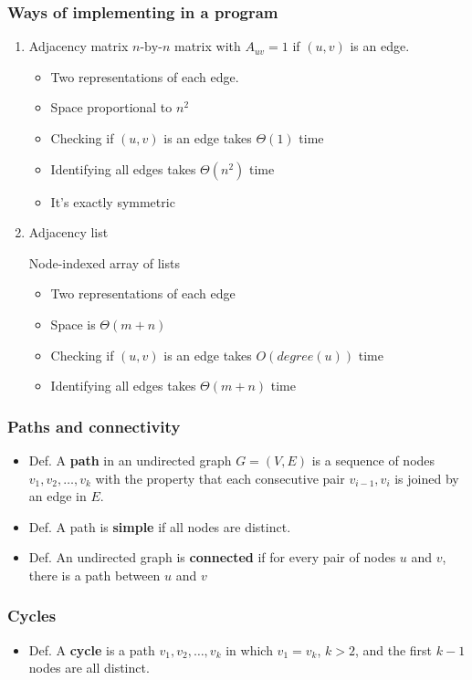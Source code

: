 \documentclass[11pt]{article}
\begin{document}
\subsubsection{Ways of implementing in a program}
\label{sec:orgc5e0200}
\begin{enumerate}
\item Adjacency matrix
\label{sec:org6967e79}
\(n\text{-by-}n\) matrix with \(A_{uv} = 1\) if \((u,v)\) is an edge.
\begin{itemize}
\item Two representations of each edge.
\item Space proportional to \(n^2\)
\item Checking if \((u,v)\) is an edge takes \(\Theta(1)\) time
\item Identifying all edges takes \(\Theta(n^2)\) time
\item It's exactly symmetric
\end{itemize}
\item Adjacency list
\label{sec:orgd9bddc1}

Node-indexed array of lists
\begin{itemize}
\item Two representations of each edge
\item Space is \(\Theta(m+n)\)
\item Checking if \((u,v)\) is an edge takes \(O(degree(u))\) time
\item Identifying all edges takes \(\Theta(m+n)\) time
\end{itemize}
\end{enumerate}
\subsubsection{Paths and connectivity}
\label{sec:orgca2abab}
\begin{itemize}
\item Def. A \textbf{path} in an undirected graph \(G=(V,E)\) is a sequence of nodes \(v_1,v_2,\ldots,v_k\) with the property that each consecutive pair \(v_{i-1},v_i\) is joined by an edge in \(E\).
\item Def. A path is \textbf{simple} if all nodes are distinct.
\item Def. An undirected graph is \textbf{connected} if for every pair of nodes \(u\) and \(v\), there is a path between \(u\) and \(v\)
\end{itemize}
\subsubsection{Cycles}
\label{sec:orgdd46d38}
\begin{itemize}
\item Def. A \textbf{cycle} is a path \(v_1, v_2, \ldots, v_k\) in which \(v_1 = v_k\), \(k>2\), and the first \(k-1\) nodes are all distinct.
\end{itemize}
\end{document}
